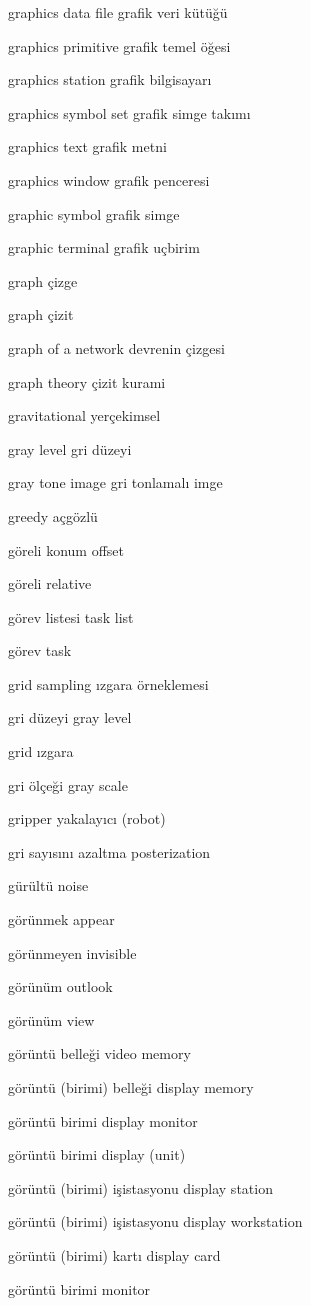 \documentclass[12pt,fleqn]{article}\usepackage{../../common}
\begin{document}
graphics data file grafik veri kütüğü

graphics primitive grafik temel öğesi

graphics station grafik bilgisayarı

graphics symbol set grafik simge takımı

graphics text grafik metni

graphics window grafik penceresi

graphic symbol grafik simge

graphic terminal grafik uçbirim

graph çizge

graph çizit

graph of a network devrenin çizgesi

graph theory çizit kurami

gravitational yerçekimsel

gray level gri düzeyi

gray tone image gri tonlamalı imge

greedy açgözlü

göreli konum offset

göreli relative

görev listesi task list

görev task

grid sampling ızgara örneklemesi

gri düzeyi gray level

grid ızgara

gri ölçeği gray scale

gripper yakalayıcı (robot)

gri sayısını azaltma posterization

gürültü noise

görünmek appear

görünmeyen invisible

görünüm outlook

görünüm view

görüntü belleği video memory

görüntü (birimi) belleği display memory

görüntü birimi display monitor

görüntü birimi display (unit)

görüntü (birimi) işistasyonu display station

görüntü (birimi) işistasyonu display workstation

görüntü (birimi) kartı display card

görüntü birimi monitor
\end{document}
